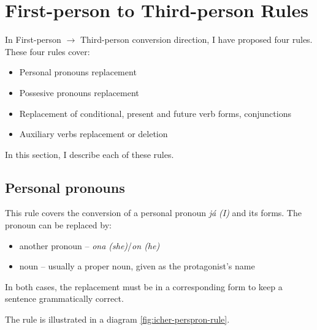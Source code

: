 \section{First-person to Third-person Rules}
In First-person $\rightarrow$ Third-person conversion direction, I have proposed four rules. These four rules cover:
	\begin{itemize}
		\item Personal pronouns replacement
		\item Possesive pronouns replacement
		\item Replacement of conditional, present and future verb forms, conjunctions
		\item Auxiliary verbs replacement or deletion
	\end{itemize}

In this section, I describe each of these rules.

\subsection{Personal pronouns}

This rule covers the conversion of a personal pronoun \emph{já (I)} and its forms. The pronoun can be replaced by:
	\begin{itemize}
		\item another pronoun -- \emph{ona (she)}/\emph{on (he)}
		\item noun -- usually a proper noun, given as the protagonist's name
	\end{itemize}

In both cases, the replacement must be in a corresponding form to keep a sentence grammatically correct.

The rule is illustrated in a diagram \ref{fig:icher-perspron-rule}.

